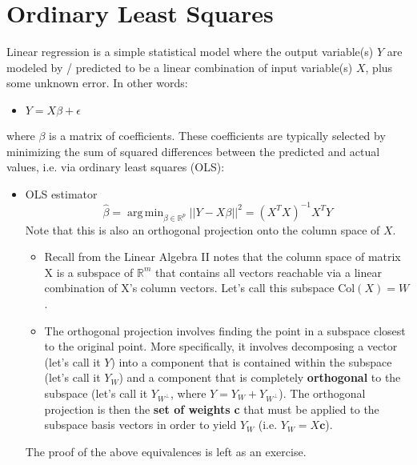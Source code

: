 \documentclass{article}
\DeclareMathOperator*{\argmin}{arg\,min}
\begin{document}
\section{Ordinary Least Squares}
Linear regression is a simple statistical model where the output variable(s) $Y$ are modeled by / predicted to be  a linear combination of input variable(s) $X$, plus some unknown error. In other words:
\begin{itemize}
    \item $Y = X\beta + \epsilon$
\end{itemize}
where $\beta$ is a matrix of coefficients. These coefficients are typically selected by minimizing the sum of squared differences between the predicted and actual values, i.e. via ordinary least squares (OLS):
\begin{itemize}
    \item OLS estimator
    \begin{equation}
        \hat{\beta} = \argmin_{\beta\in\mathbb{R}^p}||Y-X\beta||^2  = (X^TX)^{-1}X^TY
    \end{equation}
    Note that this is also an orthogonal projection onto the column space of $X$.
    \begin{itemize}
        \item Recall from the Linear Algebra II notes that the column space of matrix X is a subspace of $\mathbb{R}^m$ that contains all vectors reachable via a linear combination of X's column vectors. Let's call this subspace $\text{Col}(X) = W$.
        \item The orthogonal projection involves finding the point in a subspace closest to the original point. More specifically, it involves decomposing a vector (let's call it $Y$) into a component that is contained within the subspace (let's call it $Y_W$) and a component that is completely \textbf{orthogonal} to the subspace (let's call it $Y_{W^{\perp}}$, where $Y = Y_W + Y_{W^{\perp}}$). The orthogonal projection is then the \textbf{set of weights} \textbf{c} that must be applied to the subspace basis vectors in order to yield $Y_W$ (i.e. $Y_W = X\pmb{c}$).
    \end{itemize}
    The proof of the above equivalences is left as an exercise.
\end{itemize}
\end{document}
